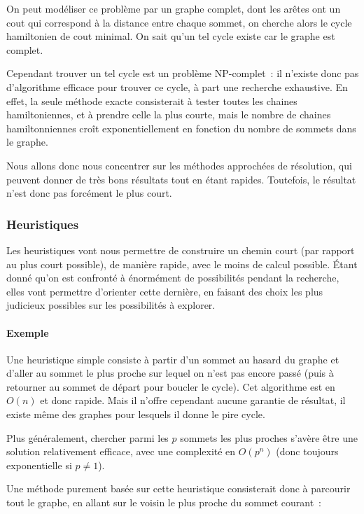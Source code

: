     On peut modéliser ce problème par un graphe complet, dont les arêtes ont un
    cout qui correspond à la distance entre chaque sommet, on cherche alors le
    cycle hamiltonien de cout minimal. On sait qu'un tel cycle existe car le
    graphe est complet.

    Cependant trouver un tel cycle est un problème NP-complet~: il n'existe
    donc pas d'algorithme efficace pour trouver ce cycle, à part une recherche
    exhaustive.
    En effet, la seule méthode exacte consisterait à tester toutes les chaines
    hamiltoniennes, et à prendre celle la plus courte, mais le nombre de chaines
    hamiltonniennes croît exponentiellement en fonction du nombre de sommets
    dans le graphe.

    Nous allons donc nous concentrer sur les méthodes approchées de résolution,
    qui peuvent donner de très bons résultats tout en étant rapides.
    Toutefois, le résultat n'est donc pas forcément le plus court.

  \subsubsection{Heuristiques}
    Les heuristiques vont nous permettre de construire un chemin court (par
    rapport au plus court possible), de manière rapide, avec le moins de calcul
    possible.  Étant donné qu'on est confronté à énormément de possibilités
    pendant la recherche, elles vont permettre d'orienter cette dernière, en
    faisant des choix les plus judicieux possibles sur les possibilités à
    explorer.

    \paragraph{Exemple} Une heuristique simple consiste à partir d'un sommet au
    hasard du graphe et d'aller au sommet le plus proche sur lequel on n'est
    pas encore passé (puis à retourner au sommet de départ pour boucler le
    cycle). Cet algorithme est en $O(n)$ et donc rapide. Mais il n'offre
    cependant aucune garantie de résultat, il existe même des graphes pour
    lesquels il donne le pire cycle.

    Plus généralement, chercher parmi les $p$ sommets les plus proches s'avère
    être une solution relativement efficace, avec une complexité en $O(p^n)$
    (donc toujours exponentielle si $p \neq 1$).

    Une méthode purement basée sur cette heuristique consisterait donc à parcourir
    tout le graphe, en allant sur le voisin le plus proche du sommet courant~:

